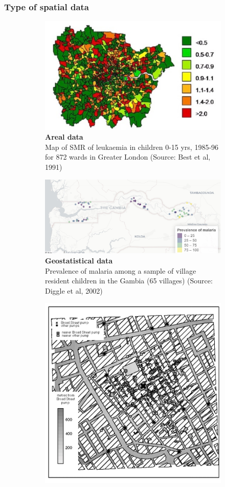 \documentclass[12pt]{beamer}
\begin{document}
\begin{frame}
\frametitle{Type of spatial data}
\vspace{-10pt}
\begin{figure}
\begin{subfigure}{.4\textwidth}
\vspace{5pt}
  \centering
  \includegraphics[width=.7\linewidth]{leukemia_1985_96.jpg}
  \caption{\tiny{\textbf{Areal data}\\  Map of SMR of leukaemia in children 0-15 yrs, 1985-96 for 872 wards in Greater London (Source: Best et al, 1991)}}
\end{subfigure}
\begin{subfigure}{.4\textwidth}
  \centering
  \vspace{9pt}
  \includegraphics[width=.8\linewidth]{malaria_map2.jpg}
    \vspace{8pt}
  \hspace{15pt}\caption{\tiny{\textbf{Geostatistical data} \\  Prevalence of malaria among a sample of village
resident children in the Gambia (65 villages) (Source: Diggle et al, 2002)}}
\end{subfigure}
\begin{subfigure}{.5\textwidth}
  \centering
  \includegraphics[width=.5\linewidth]{colera_pump.jpg}

\end{subfigure}
\end{figure}
\end{frame}
\end{document}
